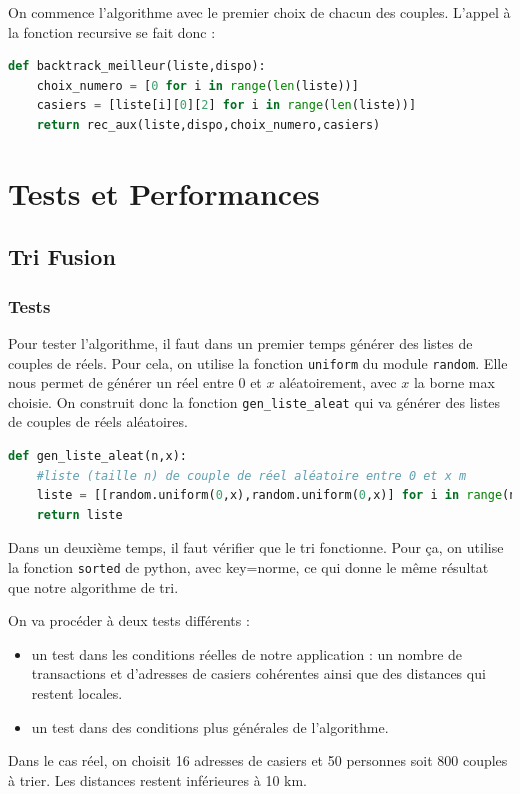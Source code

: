 \documentclass[11pt]{article}
\begin{document}
On commence l'algorithme avec le premier choix de chacun des couples. L'appel à la fonction recursive se fait donc :

\begin{lstlisting}[language=python, caption={Implémentation de l'algorithme récursif}]
def backtrack_meilleur(liste,dispo):
    choix_numero = [0 for i in range(len(liste))]
    casiers = [liste[i][0][2] for i in range(len(liste))]
    return rec_aux(liste,dispo,choix_numero,casiers)
\end{lstlisting}




\section{Tests et Performances}

\subsection{Tri Fusion}
\subsubsection{Tests}
Pour tester l’algorithme, il faut dans un premier temps générer des listes de couples de réels. Pour cela, on utilise la fonction \texttt{uniform} du module \texttt{random}. Elle nous permet de générer un réel entre 0 et $x$ aléatoirement, avec $x$ la borne max choisie. On construit donc la fonction \texttt{gen\_liste\_aleat} qui va générer des listes de couples de réels aléatoires.
\vspace{0.4cm}

\begin{lstlisting}[language=Python, caption={ Fonction \texttt{gen\_liste\_aleat.py} }]
def gen_liste_aleat(n,x):
    #liste (taille n) de couple de réel aléatoire entre 0 et x m
    liste = [[random.uniform(0,x),random.uniform(0,x)] for i in range(n)]
    return liste 
\end{lstlisting}
\vspace{0.4cm}

Dans un deuxième temps, il faut vérifier que le tri fonctionne. Pour ça, on utilise la fonction \texttt{sorted} de python, avec key=norme, ce qui donne le même résultat que notre algorithme de tri.
\vspace{0.4cm}

On va procéder à deux tests différents :

\begin{itemize}

\item un test dans les conditions réelles de notre application : un nombre de transactions et d’adresses de casiers cohérentes ainsi que des distances qui restent locales. 

\item un test dans des conditions plus générales de l’algorithme.
\end{itemize}
\vspace{0.4cm}
Dans le cas réel, on choisit 16 adresses de casiers et 50 personnes soit 800 couples à trier. Les distances restent inférieures à 10 km. 
\vspace{0.4cm}
\end{document}
